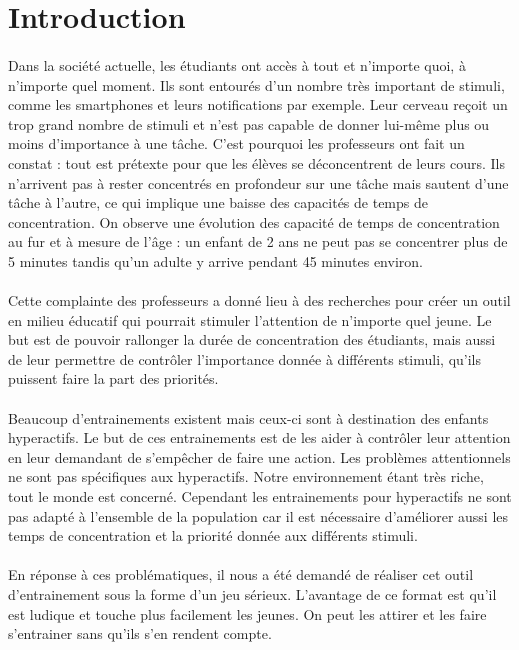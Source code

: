 \section*{Introduction}

\paragraph{}Dans la société actuelle, les étudiants ont accès à tout et n'importe quoi, à n'importe quel moment. Ils sont entourés d'un nombre très important de stimuli, comme les
smartphones et leurs notifications par exemple. Leur cerveau reçoit un trop grand nombre de stimuli et n'est pas capable de donner lui-même plus ou moins d'importance à une tâche.
C'est pourquoi les professeurs ont fait un constat : tout est prétexte pour que les élèves se déconcentrent de leurs cours. Ils n'arrivent pas à rester concentrés en profondeur sur
une tâche mais sautent d'une tâche à l'autre, ce qui implique une baisse des capacités de temps de concentration. On observe une évolution des capacité de temps de concentration au
fur et à mesure de l'âge : un enfant de 2 ans ne peut pas se concentrer plus de 5 minutes tandis qu'un adulte y arrive pendant 45 minutes environ.

\paragraph{}Cette complainte des professeurs a donné lieu à des recherches pour créer un outil en milieu éducatif qui pourrait stimuler l'attention de n'importe quel jeune. Le but
est de pouvoir rallonger la durée de concentration des étudiants, mais aussi de leur permettre de contrôler l'importance donnée à différents stimuli, qu'ils puissent faire la part des
priorités.

\paragraph{}Beaucoup d'entrainements existent mais ceux-ci sont à destination des enfants hyperactifs. Le but de ces entrainements est de les aider à contrôler leur attention en leur
demandant de s'empêcher de faire une action. Les problèmes attentionnels ne sont pas spécifiques aux hyperactifs. Notre environnement étant très riche, tout le monde est concerné.
Cependant les entrainements pour hyperactifs ne sont pas adapté à l'ensemble de la population car il est nécessaire d'améliorer aussi les temps de concentration et la priorité donnée
aux différents stimuli.

\paragraph{}En réponse à ces problématiques, il nous a été demandé de réaliser cet outil d'entrainement sous la forme d'un jeu sérieux. L'avantage de ce format est qu'il est ludique et
touche plus facilement les jeunes. On peut les attirer et les faire s'entrainer sans qu'ils s'en rendent compte.

\newpage